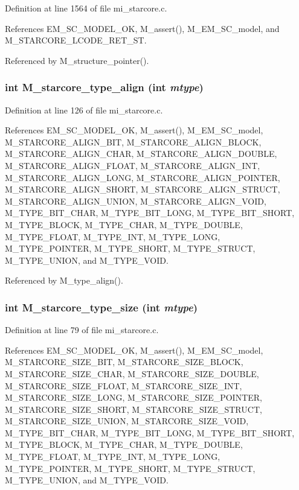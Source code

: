 Definition at line 1564 of file mi\_\-starcore.c.

References EM\_\-SC\_\-MODEL\_\-OK, M\_\-assert(), M\_\-EM\_\-SC\_\-model, and M\_\-STARCORE\_\-LCODE\_\-RET\_\-ST.

Referenced by M\_\-structure\_\-pointer().
\subsubsection{\setlength{\rightskip}{0pt plus 5cm}int M\_\-starcore\_\-type\_\-align (int {\em mtype})}\label{mi__starcore_8c_6351e61a05137c1796e48cbd19054e42}




Definition at line 126 of file mi\_\-starcore.c.

References EM\_\-SC\_\-MODEL\_\-OK, M\_\-assert(), M\_\-EM\_\-SC\_\-model, M\_\-STARCORE\_\-ALIGN\_\-BIT, M\_\-STARCORE\_\-ALIGN\_\-BLOCK, M\_\-STARCORE\_\-ALIGN\_\-CHAR, M\_\-STARCORE\_\-ALIGN\_\-DOUBLE, M\_\-STARCORE\_\-ALIGN\_\-FLOAT, M\_\-STARCORE\_\-ALIGN\_\-INT, M\_\-STARCORE\_\-ALIGN\_\-LONG, M\_\-STARCORE\_\-ALIGN\_\-POINTER, M\_\-STARCORE\_\-ALIGN\_\-SHORT, M\_\-STARCORE\_\-ALIGN\_\-STRUCT, M\_\-STARCORE\_\-ALIGN\_\-UNION, M\_\-STARCORE\_\-ALIGN\_\-VOID, M\_\-TYPE\_\-BIT\_\-CHAR, M\_\-TYPE\_\-BIT\_\-LONG, M\_\-TYPE\_\-BIT\_\-SHORT, M\_\-TYPE\_\-BLOCK, M\_\-TYPE\_\-CHAR, M\_\-TYPE\_\-DOUBLE, M\_\-TYPE\_\-FLOAT, M\_\-TYPE\_\-INT, M\_\-TYPE\_\-LONG, M\_\-TYPE\_\-POINTER, M\_\-TYPE\_\-SHORT, M\_\-TYPE\_\-STRUCT, M\_\-TYPE\_\-UNION, and M\_\-TYPE\_\-VOID.

Referenced by M\_\-type\_\-align().
\subsubsection{\setlength{\rightskip}{0pt plus 5cm}int M\_\-starcore\_\-type\_\-size (int {\em mtype})}\label{mi__starcore_8c_d005e63661bf877f53eb5b8a8f63d8ae}




Definition at line 79 of file mi\_\-starcore.c.

References EM\_\-SC\_\-MODEL\_\-OK, M\_\-assert(), M\_\-EM\_\-SC\_\-model, M\_\-STARCORE\_\-SIZE\_\-BIT, M\_\-STARCORE\_\-SIZE\_\-BLOCK, M\_\-STARCORE\_\-SIZE\_\-CHAR, M\_\-STARCORE\_\-SIZE\_\-DOUBLE, M\_\-STARCORE\_\-SIZE\_\-FLOAT, M\_\-STARCORE\_\-SIZE\_\-INT, M\_\-STARCORE\_\-SIZE\_\-LONG, M\_\-STARCORE\_\-SIZE\_\-POINTER, M\_\-STARCORE\_\-SIZE\_\-SHORT, M\_\-STARCORE\_\-SIZE\_\-STRUCT, M\_\-STARCORE\_\-SIZE\_\-UNION, M\_\-STARCORE\_\-SIZE\_\-VOID, M\_\-TYPE\_\-BIT\_\-CHAR, M\_\-TYPE\_\-BIT\_\-LONG, M\_\-TYPE\_\-BIT\_\-SHORT, M\_\-TYPE\_\-BLOCK, M\_\-TYPE\_\-CHAR, M\_\-TYPE\_\-DOUBLE, M\_\-TYPE\_\-FLOAT, M\_\-TYPE\_\-INT, M\_\-TYPE\_\-LONG, M\_\-TYPE\_\-POINTER, M\_\-TYPE\_\-SHORT, M\_\-TYPE\_\-STRUCT, M\_\-TYPE\_\-UNION, and M\_\-TYPE\_\-VOID.

